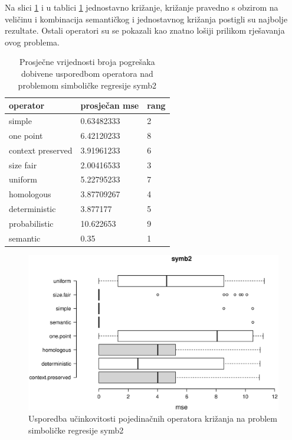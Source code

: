 Na slici \ref{symb2box} i u tablici \ref{symb2table} jednostavno križanje, križanje pravedno s obzirom na veličinu i kombinacija semantičkog i jednostavnog križanja postigli su najbolje rezultate. Ostali operatori su se pokazali kao znatno lošiji prilikom rješavanja ovog problema.

\begin{table}[H]
 	\centering

    \begin{tabular}{| l | l | l |}
    \hline
    \textbf{operator} & \textbf{prosječan mse}  & \textbf{rang}\\ \hline
    simple & 0.63482333 & 2\\ \hline
    one point & 6.42120233 & 8\\ \hline
    context preserved & 3.91961233 & 6\\ \hline
    size fair & 2.00416533 & 3\\ \hline
    uniform & 5.22795233 & 7\\ \hline
    homologous & 3.87709267 & 4\\ \hline
    deterministic &3.877177 & 5\\ \hline
    probabilistic & 10.622653 & 9\\ \hline
    semantic & 0.35 & 1\\ \hline
    \end{tabular}
    
    \caption{Prosječne vrijednosti broja pogrešaka dobivene usporedbom operatora nad problemom simboličke regresije symb2}
    \label{symb2table}
\end{table}

\begin{figure}[H]
	\centering
	\includegraphics[trim=0cm 4cm 0cm 0cm, scale=0.6]{./slike/boxPlots/symb2.eps}
	\caption{Usporedba učinkovitosti pojedinačnih operatora križanja na problem simboličke regresije symb2}
	\label{symb2box}
\end{figure}

